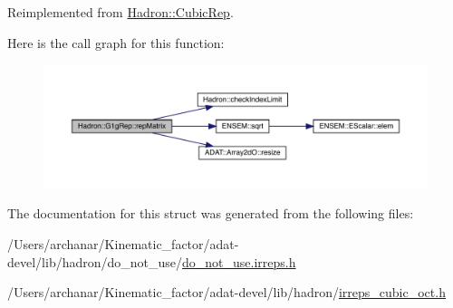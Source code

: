 Reimplemented from \mbox{\hyperlink{structHadron_1_1CubicRep_ac5d7e9e6f4ab1158b5fce3e4ad9e8005}{Hadron\+::\+Cubic\+Rep}}.

Here is the call graph for this function\+:
\nopagebreak
\begin{figure}[H]
\begin{center}
\leavevmode
\includegraphics[width=350pt]{d4/d3c/structHadron_1_1G1gRep_a0671004832091015635bb8565653340c_cgraph}
\end{center}
\end{figure}


The documentation for this struct was generated from the following files\+:\begin{DoxyCompactItemize}
\item 
/\+Users/archanar/\+Kinematic\+\_\+factor/adat-\/devel/lib/hadron/do\+\_\+not\+\_\+use/\mbox{\hyperlink{adat-devel_2lib_2hadron_2do__not__use_2do__not__use_8irreps_8h}{do\+\_\+not\+\_\+use.\+irreps.\+h}}\item 
/\+Users/archanar/\+Kinematic\+\_\+factor/adat-\/devel/lib/hadron/\mbox{\hyperlink{adat-devel_2lib_2hadron_2irreps__cubic__oct_8h}{irreps\+\_\+cubic\+\_\+oct.\+h}}\end{DoxyCompactItemize}
